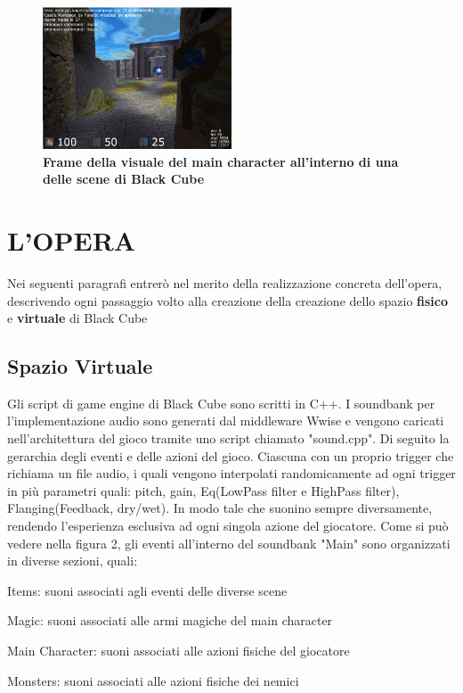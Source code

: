 	\begin{figure}[h]
		\begin{center}
			\includegraphics[width=0.5\textwidth]{img/animation.jpg}
			\caption {\textbf{Frame della visuale del main character all'interno di una delle scene di Black Cube}}
		\end{center}
	\end{figure}

\section{L'OPERA}
Nei seguenti paragrafi entrerò nel merito della realizzazione concreta dell'opera, descrivendo ogni passaggio volto alla creazione della creazione dello spazio \textbf{fisico} e \textbf{virtuale} di Black Cube

	\subsection{Spazio Virtuale}
	Gli script di game engine di Black Cube sono scritti in C++. I soundbank per l'implementazione audio sono generati dal middleware Wwise e vengono caricati nell'architettura del gioco tramite uno script chiamato "sound.cpp". Di seguito la gerarchia degli eventi e delle azioni del gioco. Ciascuna con un proprio trigger che richiama un file audio, i quali vengono interpolati randomicamente ad ogni trigger in più parametri quali: pitch, gain, Eq(LowPass filter e HighPass filter), Flanging(Feedback, dry/wet). In modo tale che suonino sempre diversamente, rendendo l'esperienza esclusiva ad ogni singola azione del giocatore.
	Come si può vedere nella figura 2, gli eventi all'interno del soundbank "Main" sono organizzati in diverse sezioni, quali:
	\begin{compactitem}
		\item Items: suoni associati agli eventi delle diverse scene
		\item Magic: suoni associati alle armi magiche del main character
		\item Main Character: suoni associati alle azioni fisiche del giocatore
		\item Monsters: suoni associati alle azioni fisiche dei nemici
	\end{compactitem}

